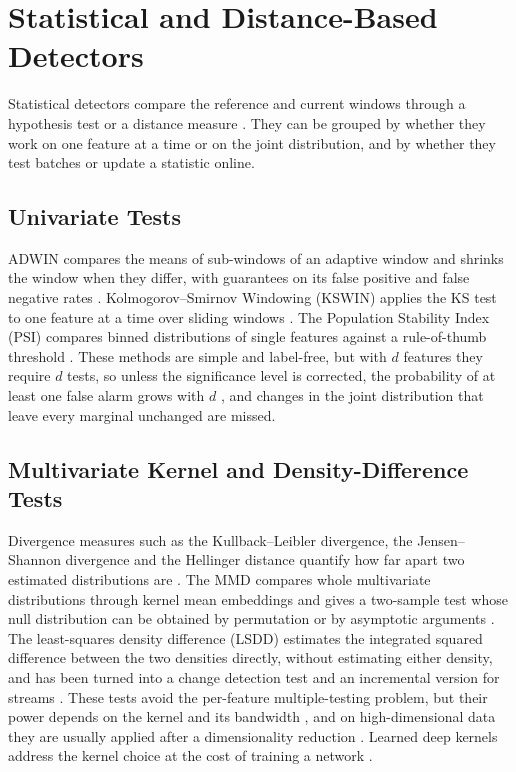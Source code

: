 \section{Statistical and Distance-Based Detectors}
\label{sec:lit-statistical}
Statistical detectors compare the reference and current windows through a hypothesis test or a distance measure \citep{Rabanser2019, Raab2020, BifetGavalda2007}. They can be grouped by whether they work on one feature at a time or on the joint distribution, and by whether they test batches or update a statistic online.

\subsection{Univariate Tests}
ADWIN compares the means of sub-windows of an adaptive window and shrinks the window when they differ, with guarantees on its false positive and false negative rates \citep{BifetGavalda2007}. Kolmogorov--Smirnov Windowing (KSWIN) applies the KS test to one feature at a time over sliding windows \citep{Raab2020}. The Population Stability Index (PSI) compares binned distributions of single features against a rule-of-thumb threshold \citep{Yurdakul2018}. These methods are simple and label-free, but with $d$ features they require $d$ tests, so unless the significance level is corrected, the probability of at least one false alarm grows with $d$ \citep{Rabanser2019}, and changes in the joint distribution that leave every marginal unchanged are missed.

\subsection{Multivariate Kernel and Density-Difference Tests}
Divergence measures such as the Kullback--Leibler divergence, the Jensen--Shannon divergence and the Hellinger distance quantify how far apart two estimated distributions are \citep{Dasu2006, DitzlerPolikar2011}. The MMD compares whole multivariate distributions through kernel mean embeddings and gives a two-sample test whose null distribution can be obtained by permutation or by asymptotic arguments \citep{Gretton2012}. The least-squares density difference (LSDD) estimates the integrated squared difference between the two densities directly, without estimating either density, and has been turned into a change detection test \citep{Bu2018} and an incremental version for streams \citep{Bu2017}. These tests avoid the per-feature multiple-testing problem, but their power depends on the kernel and its bandwidth \citep{Gretton2012}, and on high-dimensional data they are usually applied after a dimensionality reduction \citep{Rabanser2019}. Learned deep kernels address the kernel choice at the cost of training a network \citep{Liu2020}.


